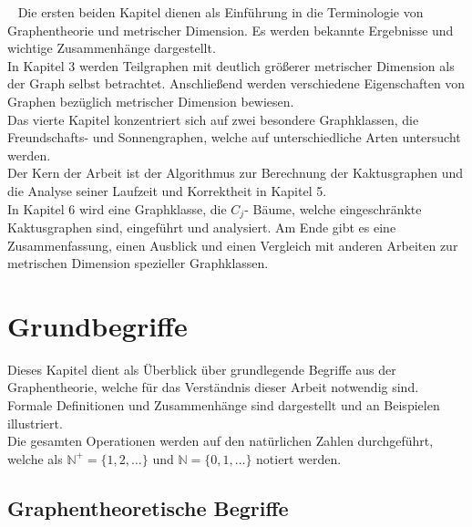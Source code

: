 \vspace{-2mm}
~\linebreak
Die ersten beiden Kapitel dienen als Einführung in die Terminologie von Graphentheorie und metrischer Dimension. Es werden bekannte Ergebnisse und wichtige Zusammenhänge dargestellt.\\In Kapitel 3 werden Teilgraphen mit deutlich größerer metrischer Dimension als der Graph selbst betrachtet. Anschließend werden verschiedene Eigenschaften von Graphen bezüglich metrischer Dimension bewiesen.\\ 
Das vierte Kapitel konzentriert sich auf zwei besondere Graphklassen, die Freundschafts- und Sonnengraphen, welche auf unterschiedliche Arten untersucht werden.\\Der Kern der Arbeit ist der Algorithmus zur Berechnung der Kaktusgraphen und die Analyse seiner Laufzeit und Korrektheit in Kapitel 5.\\In Kapitel 6 wird eine Graphklasse, die $C_j$- Bäume, welche eingeschränkte Kaktusgraphen sind, eingeführt und analysiert. Am Ende gibt es eine Zusammenfassung, einen Ausblick und einen Vergleich mit anderen Arbeiten zur metrischen Dimension spezieller Graphklassen.
\chapter{Grundbegriffe}
\vspace{-4mm}
Dieses Kapitel dient als Überblick über grundlegende Begriffe aus der Graphentheorie, welche für das Verständnis dieser Arbeit notwendig sind. Formale Definitionen und Zusammenhänge sind dargestellt und an Beispielen illustriert.%
\\
Die gesamten Operationen werden auf den natürlichen Zahlen durchgeführt, welche als $\mathbb{N}^+=\{1,2,\ldots\}$ und $\mathbb{N}=\{0,1,\ldots\}$ notiert werden.
\vspace{-2mm}
\section{Graphentheoretische Begriffe}
\vspace{-1mm}
\label{chap_prel}
